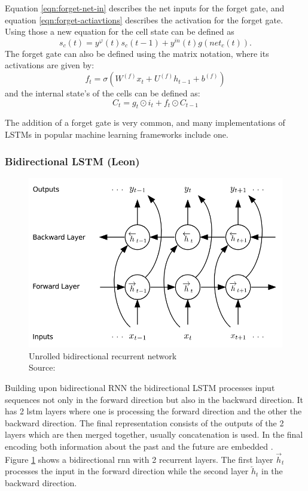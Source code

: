 \documentclass[twoside,a4paper,10pt,DIV=12,BCOR=12mm]{scrartcl}
\begin{document}
Equation \ref{eqn:forget-net-in} describes the net inputs for the forget gate, and equation \ref{eqn:forget-actiavtions} describes the activation for the forget gate. Using those a new equation for the cell state can be defined as\cite{gers1999forgetgate}
\begin{equation}
    s_c(t)=y^\varphi(t)s_c(t-1)+y^{in}(t)g\left(net_c(t)\right).    
\end{equation}
The forget gate can also be defined using the matrix notation, where its activations are given by:\cite{smagulova2019notation}
$$f_t=\sigma\left(W^{(f)}x_t+U^{(f)}h_{t-1}+b^{(f)}\right)$$
and the internal state's of the cells can be defined as:\cite{smagulova2019notation}
$$C_t=g_t\odot i_t+f_t\odot C_{t-1}$$

The addition of a forget gate is very common, and many implementations of LSTMs in popular machine learning frameworks include one.\cite{smagulova2019notation,keras-lstm, real-pytorch-lstm, pytorch-lstm} 

\subsubsection{Bidirectional LSTM (Leon)}

\begin{figure}[h!]
    \centering
    \includegraphics[height=7.5cm]{brnn.png}
    \caption{Unrolled bidirectional recurrent network\\ Source: \cite{graves2013speechrecognitiondeeprecurrent}}
    \label{fig:brnn}
\end{figure}

Building upon bidirectional RNN \cite{Schuster97} the bidirectional LSTM processes input sequences not only in the 
forward direction but also in the backward direction. It has 2 lstm layers where one is processing the forward direction
and the other the backward direction. The final representation consists of the outputs of the 2 layers which are then merged together,
usually concatenation is used. In the final encoding both information about the past and the future are embedded \cite{Graves05}.\\
Figure \ref{fig:brnn} shows a bidirectional rnn with 2 recurrent layers. The first layer $\overrightarrow{h}_t$ processes
the input in the forward direction while the second layer $\overleftarrow{h}_t$ in the backward direction.
\end{document}
